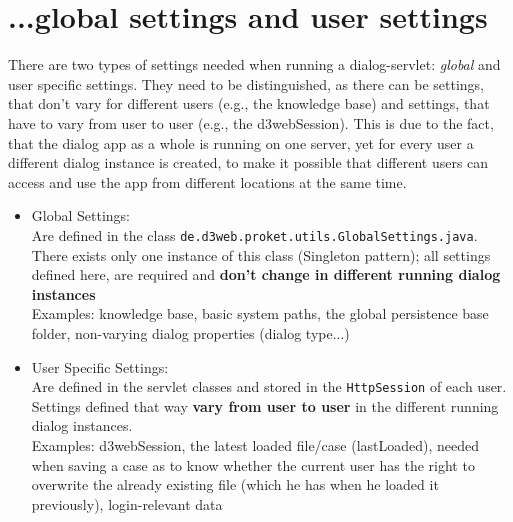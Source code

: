\documentclass[a4paper,10pt]{scrreprt}
\begin{document}
\section{...global settings and user settings}
There are two types of settings needed when running a dialog-servlet: \textit{global} and {user specific} settings.
They need to be distinguished, as there can be settings, that don't vary for different users (e.g., the knowledge base) and settings, that have to vary from user to user (e.g., the d3webSession). 
This is due to the fact, that the dialog app as a whole is running on one server, yet for every user a different dialog instance is created, to make it possible that different users can access and use the app from different locations at the same time.
\begin{itemize}
	\item Global Settings:\\
	Are defined in the class \texttt{de.d3web.proket.utils.GlobalSettings.java}.\\
	There exists only one instance of this class (Singleton pattern); all settings defined here, are required and \textbf{don't change in different running dialog instances}\\
	Examples: knowledge base, basic system paths, the global persistence base folder, non-varying dialog properties (dialog type...)
	\item User Specific Settings:\\
	Are defined in the servlet classes and stored in the \texttt{HttpSession} of each user.\\
	Settings defined that way \textbf{vary from user to user} in the different running dialog instances.\\
	Examples: d3webSession, the latest loaded file/case (lastLoaded), needed when saving a case as to know whether the current user has the right to overwrite the already existing file (which he has when he loaded it previously), login-relevant data
\end{itemize}
\end{document}
